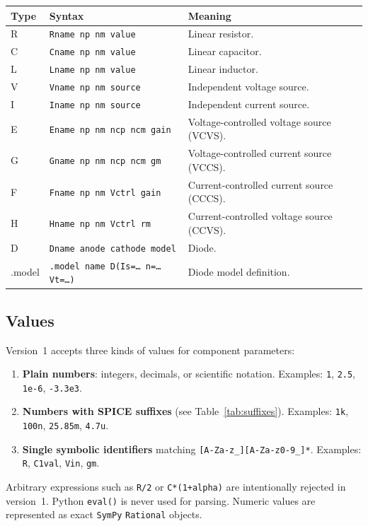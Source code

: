 \documentclass[11pt,a4paper]{article}
\newcommand{\code}[1]{\texttt{#1}}
\newcommand{\sympy}{\texttt{SymPy}}
\begin{document}
\begin{longtable}{p{}p{}p{}}
\toprule
Type & Syntax & Meaning \\
\midrule
R & \code{Rname np nm value} & Linear resistor. \\
C & \code{Cname np nm value} & Linear capacitor. \\
L & \code{Lname np nm value} & Linear inductor. \\
V & \code{Vname np nm source} & Independent voltage source. \\
I & \code{Iname np nm source} & Independent current source. \\
E & \code{Ename np nm ncp ncm gain} & Voltage-controlled voltage source (VCVS). \\
G & \code{Gname np nm ncp ncm gm} & Voltage-controlled current source (VCCS). \\
F & \code{Fname np nm Vctrl gain} & Current-controlled current source (CCCS). \\
H & \code{Hname np nm Vctrl rm} & Current-controlled voltage source (CCVS). \\
D & \code{Dname anode cathode model} & Diode. \\
.model & \code{.model name D(Is=\ldots{} n=\ldots{} Vt=\ldots{})} & Diode model definition. \\
\bottomrule
\end{longtable}

\subsection{Values}

Version~1 accepts three kinds of values for component parameters:

\begin{enumerate}[noitemsep]
    \item \textbf{Plain numbers}: integers, decimals, or scientific notation.
          Examples: \code{1}, \code{2.5}, \code{1e-6}, \code{-3.3e3}.
    \item \textbf{Numbers with SPICE suffixes} (see Table~\ref{tab:suffixes}).
          Examples: \code{1k}, \code{100n}, \code{25.85m}, \code{4.7u}.
    \item \textbf{Single symbolic identifiers} matching
          \verb|[A-Za-z_][A-Za-z0-9_]*|.
          Examples: \code{R}, \code{C1val}, \code{Vin}, \code{gm}.
\end{enumerate}

Arbitrary expressions such as \code{R/2} or \code{C*(1+alpha)} are
intentionally rejected in version~1.
Python \code{eval()} is never used for parsing.
Numeric values are represented as exact \sympy{} \code{Rational} objects.
\end{document}
